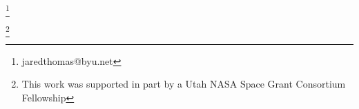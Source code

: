 \date{}

\author{
	Jared J.~Thomas\textsuperscript{1,2} \\
	Spencer McOmber \\
	Andrew Ning
	\\
	\\
	Department of Mechanical Engineering \\
	Brigham Young University \\
	Utah \\
	United States of America \\
	\\
	\\
}


	\begin{titlepage}
	
	\maketitle
	\thanks[1]{
		jaredthomas@byu.net
	}

	\thanks[2]{
		This work was supported in part by a Utah NASA Space Grant Consortium Fellowship
	}

	\end{titlepage}
	
	
